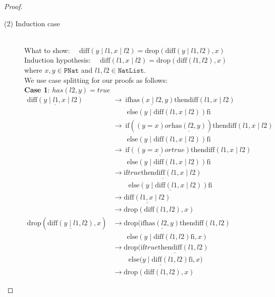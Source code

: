 \documentclass[12pt, a4paper]{article}
\newcommand{\rel}[1]{\mathrel{#1}}
\newcommand{\rmx}[1]{\mathrm{#1}}
\newcommand{\larrow}{\longrightarrow}
\newcommand{\under}{\underline}
\begin{document}
\begin{proof}
\begin{description}
\item[(2) Induction case]~\\
What to show: $\quad \rmx{diff}(y \mid l1, x \mid l2) = \rmx{drop}(\rmx{diff}(y \mid l1, l2), x)$ \\
Induction hypothesis: $\quad \rmx{diff}(l1, x \mid l2) = \rmx{drop}(\rmx{diff}(l1, l2), x)$  \\
where $x,y \in \mathtt{PNat}$ and $l1, l2 \in \mathtt{NatList}$.\\
We use case splitting for our proofs as follows: \\
\textbf{Case 1}: $has(l2, y) = true$
\begin{align*}
\under{\rmx{diff}(y \mid l1, x \mid l2)}
	&\larrow\ \rel{\rmx{if}} \under{\rmx{has}(x \mid l2, y)} \rel{\rmx{then}} \rmx{diff}(l1, x \mid l2) \\
	&\quad \quad \rel{\rmx{else}} (y \mid \rmx{diff}(l1, x \mid l2)) \rel{\rmx{fi}} \tag{by diff2} \\
	&\larrow\ \rel{\rmx{if}} ((y = x) \rel{or} \under{\rmx{has}(l2, y)}) \rel{\rmx{then}} \rmx{diff}(l1, x \mid l2) \\
	&\quad \quad \rel{\rmx{else}} (y \mid \rmx{diff}(l1, x \mid l2)) \rel{\rmx{fi}} \tag{by has2} \\
	&\larrow\ \rel{\rmx{if}} \under{((y = x) \rel{or} true)} \rel{\rmx{then}} \rmx{diff}(l1, x \mid l2) \\
	&\quad \quad \rel{\rmx{else}} (y \mid \rmx{diff}(l1, x \mid l2)) \rel{\rmx{fi}} \tag{by case splitting} \\
	&\larrow \under{\rel{\rmx{if}} true \rel{\rmx{then}} \rmx{diff}(l1, x \mid l2)} \\
	&\quad \quad\ \under{\rel{\rmx{else}} (y \mid \rmx{diff}(l1, x \mid l2)) \rel{\rmx{fi}}} \tag{by or} \\
	&\larrow \under{\rmx{diff}(l1, x \mid l2)} \tag{by if1} \\
	&\larrow \rmx{drop}(\rmx{diff}(l1, l2), x) \tag{by IH} \\
\rmx{drop}(\under{\rmx{diff}(y \mid l1, l2)}, x)
	&\larrow \rmx{drop}(\rel{\rmx{if}} \under{\rmx{has}(l2, y)} \rel{\rmx{then}} \rmx{diff}(l1, l2) \\
	&\quad \quad \rel{\rmx{else}} (y \mid \rmx{diff}(l1, l2) \rel{\rmx{fi}}, x) \tag{by diff2} \\
	&\larrow \rmx{drop}(\under{\rel{\rmx{if}} true \rel{\rmx{then}} \rmx{diff}(l1, l2)} \\
	&\quad \quad\ \under{\rel{\rmx{else}} (y \mid \rmx{diff}(l1, l2) \rel{\rmx{fi}}}, x) \tag{by case splitting} \\
	&\larrow \rmx{drop}(\rmx{diff}(l1, l2), x) \tag{by if1}
\end{align*}


\end{description}
\end{proof}
\end{document}
